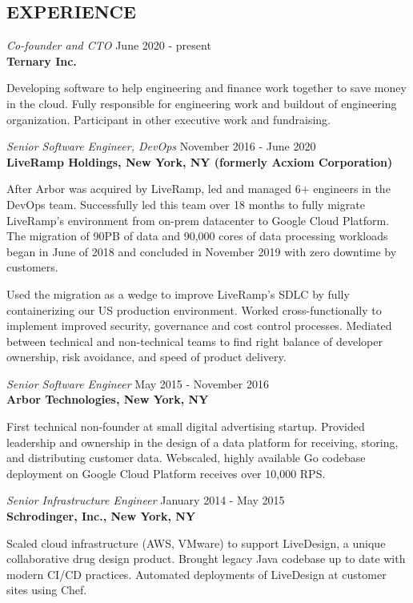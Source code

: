 \documentclass[overlapped,line,margin]{res}
\begin{document}
\begin{resume}
\section{EXPERIENCE}
\textit{Co-founder and CTO} \hfill June 2020 - present \\
\textbf{Ternary Inc.}

  Developing software to help engineering and finance work together to
  save money in the cloud. Fully responsible for engineering work and
  buildout of engineering organization. Participant in other executive
  work and fundraising.

\textit{Senior Software Engineer, DevOps} \hfill November 2016 - June 2020 \\
\textbf{LiveRamp Holdings, New York, NY (formerly Acxiom Corporation)}

  After Arbor was acquired by LiveRamp, led and managed 6+ engineers in
  the DevOps team. Successfully led this team over 18 months to fully
  migrate LiveRamp's environment from on-prem datacenter to Google Cloud
  Platform. The migration of 90PB of data and 90,000 cores of data
  processing workloads began in June of 2018 and concluded in November
  2019 with zero downtime by customers.

  Used the migration as a wedge to improve LiveRamp's SDLC by fully
  containerizing our US production environment. Worked cross-functionally
  to implement improved security, governance and cost control processes.
  Mediated between technical and non-technical teams to find right balance
  of developer ownership, risk avoidance, and speed of product delivery.

\textit{Senior Software Engineer} \hfill May 2015 - November 2016 \\
\textbf{Arbor Technologies, New York, NY}

  First technical non-founder at small digital advertising startup.
  Provided leadership and ownership in the design of a data platform for
  receiving, storing, and distributing customer data. Webscaled, highly
  available Go codebase deployment on Google Cloud Platform receives
  over 10,000 RPS.

\textit{Senior Infrastructure Engineer} \hfill January 2014 - May 2015 \\
\textbf{Schrodinger, Inc., New York, NY}

  Scaled cloud infrastructure (AWS, VMware) to support LiveDesign, a
  unique collaborative drug design product. Brought legacy Java codebase
  up to date with modern CI/CD practices. Automated deployments of
  LiveDesign at customer sites using Chef.


\end{resume}
\end{document}
